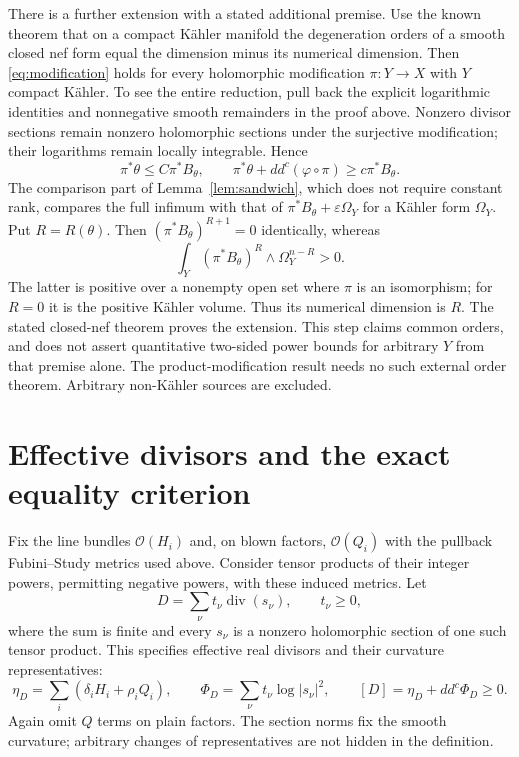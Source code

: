 \documentclass[11pt]{article}
\newcommand{\ddc}{dd^c}
\begin{document}
There is a further extension with a stated additional premise.
Use the known theorem that on a compact K\"ahler manifold the
degeneration orders of a smooth closed nef form equal the dimension
minus its numerical dimension. Then \eqref{eq:modification} holds
for every holomorphic modification $\pi:Y\to X$ with $Y$ compact
K\"ahler. To see the entire reduction, pull back the explicit
logarithmic identities and nonnegative smooth remainders in the proof
above. Nonzero divisor sections remain nonzero holomorphic sections
under the surjective modification; their logarithms remain locally
integrable. Hence
\[
 \pi^*\theta\leq C\pi^*B_\theta,
 \qquad \pi^*\theta+\ddc(\varphi\circ\pi)\geq c\pi^*B_\theta.
\]
The comparison part of Lemma~\ref{lem:sandwich}, which does not
require constant rank, compares the full infimum with that of
$\pi^*B_\theta+\varepsilon\Omega_Y$ for a K\"ahler form
$\Omega_Y$. Put $R=R(\theta)$. Then
$(\pi^*B_\theta)^{R+1}=0$ identically, whereas
\[
 \int_Y(\pi^*B_\theta)^R\wedge\Omega_Y^{n-R}>0.
\]
The latter is positive over a nonempty open set where $\pi$ is an
isomorphism; for $R=0$ it is the positive K\"ahler volume.
Thus its numerical dimension is $R$. The stated closed-nef theorem
proves the extension. This step claims common orders, and does not
assert quantitative two-sided power bounds for arbitrary $Y$ from
that premise alone. The product-modification result needs no such
external order theorem. Arbitrary non-K\"ahler sources are excluded.

\section{Effective divisors and the exact equality criterion}
Fix the line bundles $\mathcal O(H_i)$ and, on blown factors,
$\mathcal O(Q_i)$ with the pullback Fubini--Study metrics used above.
Consider tensor products of their integer powers, permitting negative
powers, with these induced metrics. Let
\[
 D=\sum_\nu t_\nu\operatorname{div}(s_\nu),\qquad t_\nu\geq0,
\]
where the sum is finite and every $s_\nu$ is a nonzero holomorphic
section of one such tensor product. This specifies effective real divisors and their
curvature representatives:
\[
 \eta_D=\sum_i(\delta_iH_i+\rho_iQ_i),
 \qquad \Phi_D=\sum_\nu t_\nu\log|s_\nu|^2,
 \qquad [D]=\eta_D+\ddc\Phi_D\geq0.
\]
Again omit $Q$ terms on plain factors. The section norms fix the
smooth curvature; arbitrary changes of representatives are not hidden
in the definition.
\end{document}
